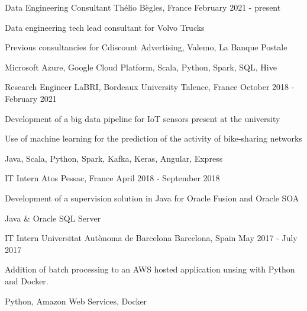 
\begin{cventries}

	\cventry
	{Data Engineering Consultant}
	{Thélio}
	{Bègles, France}
	{February 2021 - present}
	{
		\begin{cvitems}
			\item {Data engineering tech lead consultant for Volvo Trucks}
			\item {Previous consultancies for Cdiscount Advertising, Valemo, La Banque Postale}
			\item {Microsoft Azure, Google Cloud Platform, Scala, Python, Spark, SQL, Hive}
		\end{cvitems}
	}

	\cventry
	{Research Engineer}
	{LaBRI, Bordeaux University}
	{Talence, France}
	{October 2018 - February 2021}
	{
		\begin{cvitems}
			\item {Development of a big data pipeline for IoT sensors present at the university}
			\item {Use of machine learning for the prediction of the activity of bike-sharing networks}
			\item {Java, Scala, Python, Spark, Kafka, Keras, Angular, Express}
		\end{cvitems}
	}

	\cventry
	{IT Intern}
	{Atos}
	{Pessac, France}
	{April 2018 - September 2018}
	{
		\begin{cvitems}
			\item {Development of a supervision solution in Java for Oracle Fusion and Oracle SOA}
			\item {Java \& Oracle SQL Server}
		\end{cvitems}
	}
	
	\cventry
	{IT Intern}
	{Universitat Autònoma de Barcelona}
	{Barcelona, Spain}
	{May 2017 - July 2017}
	{
		\begin{cvitems}
			\item {Addition of batch processing to an AWS hosted application unsing with Python and Docker.}
			\item {Python, Amazon Web Services, Docker}
		\end{cvitems}
	}

\end{cventries}